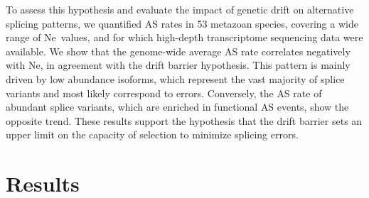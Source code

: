 To assess this hypothesis and evaluate the impact of genetic drift on alternative splicing patterns, we quantified \acrshort{AS} rates in 53 metazoan species, covering a wide range of \acrshort{Ne}~values, and for which high-depth transcriptome sequencing data were available. We show that the genome-wide average \acrshort{AS} rate correlates negatively with \acrshort{Ne}, in agreement with the drift barrier hypothesis. This pattern is mainly driven by low abundance isoforms, which represent the vast majority of splice variants and most likely correspond to errors. Conversely, the \acrshort{AS} rate of abundant splice variants, which are enriched in functional \acrshort{AS} events, show the opposite trend. These results support the hypothesis that the drift barrier sets an upper limit on the capacity of selection to minimize splicing errors.

\section{Results}

